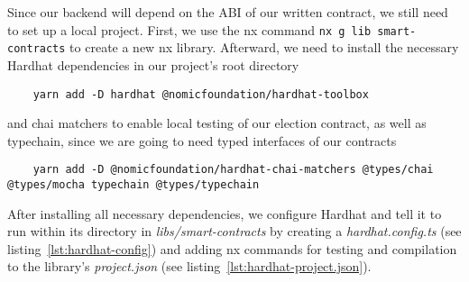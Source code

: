 Since our backend will depend on the \gls{ABI} of our written contract, we still need to set up a local project.
First, we use the nx command \texttt{nx g lib smart-contracts} to create a new nx library.
Afterward, we need to install the necessary Hardhat dependencies in our project's root directory

\begin{verbatim}
    yarn add -D hardhat @nomicfoundation/hardhat-toolbox
\end{verbatim}

and chai matchers to enable local testing of our election contract, as well as typechain, since we are going to need typed interfaces of our contracts

\begin{verbatim}
    yarn add -D @nomicfoundation/hardhat-chai-matchers @types/chai @types/mocha typechain @types/typechain
\end{verbatim}

After installing all necessary dependencies, we configure Hardhat and tell it to run within its directory in \emph{libs/smart-contracts} by creating a \emph{hardhat.config.ts} (see listing~\ref{lst:hardhat-config}) and adding nx commands for testing and compilation to the library's \emph{project.json} (see listing~\ref{lst:hardhat-project.json}).
















